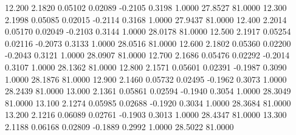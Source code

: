   12.200   2.1820   0.05102   0.02089  -0.2105   0.3198   1.0000  27.8527  81.0000
  12.300   2.1998   0.05085   0.02015  -0.2114   0.3168   1.0000  27.9437  81.0000
  12.400   2.2014   0.05170   0.02049  -0.2103   0.3144   1.0000  28.0178  81.0000
  12.500   2.1917   0.05254   0.02116  -0.2073   0.3133   1.0000  28.0516  81.0000
  12.600   2.1802   0.05360   0.02200  -0.2043   0.3121   1.0000  28.0907  81.0000
  12.700   2.1686   0.05476   0.02292  -0.2014   0.3107   1.0000  28.1362  81.0000
  12.800   2.1571   0.05601   0.02391  -0.1987   0.3090   1.0000  28.1876  81.0000
  12.900   2.1460   0.05732   0.02495  -0.1962   0.3073   1.0000  28.2439  81.0000
  13.000   2.1361   0.05861   0.02594  -0.1940   0.3054   1.0000  28.3049  81.0000
  13.100   2.1274   0.05985   0.02688  -0.1920   0.3034   1.0000  28.3684  81.0000
  13.200   2.1216   0.06089   0.02761  -0.1903   0.3013   1.0000  28.4347  81.0000
  13.300   2.1188   0.06168   0.02809  -0.1889   0.2992   1.0000  28.5022  81.0000
